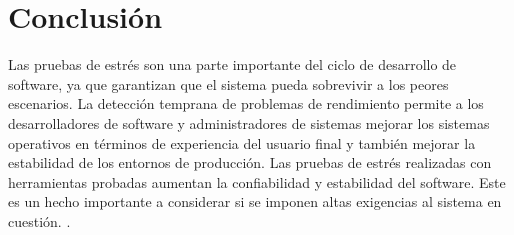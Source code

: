 \documentclass[a4paper,12pt]{article}
\begin{document}
\section{Conclusión}

Las pruebas de estrés son una parte importante del ciclo de desarrollo de software, ya que garantizan que el sistema pueda sobrevivir a los peores escenarios. La detección temprana de problemas de rendimiento permite a los desarrolladores de software y administradores de sistemas mejorar los sistemas operativos en términos de experiencia del usuario final y también mejorar la estabilidad de los entornos de producción. Las pruebas de estrés realizadas con herramientas probadas aumentan la confiabilidad y estabilidad del software. Este es un hecho importante a considerar si se imponen altas exigencias al sistema en cuestión.
.



\newpage

\printbibliography

\cite{Aggarwal2024854}
\cite{AguilarCastro1997203}
\cite{Azketa2021113}
\cite{Caram2012119}
\cite{Castro2007170}
\cite{Dzulkifly2025178}
\cite{Gómez-Baryolo2017}
\cite{Huang2024853}
\cite{Martínez2021343}
\cite{Rao20241026}
\cite{Saini2024}
\cite{Xavier2025276}
\cite{Zou2024}
\cite{Li20241827}
\cite{Terencio2023154}
\end{document}
